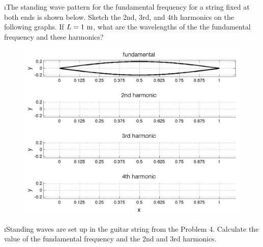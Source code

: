 \i The standing wave pattern for the fundamental
frequency for a string fixed at both ends is
shown below.
Sketch the 2nd, 3rd, and 4th harmonics on the
following graphs.
If $L=1~{\rm m}$, what are the wavelengths of the
the fundamental frequency and these harmonics?
%
\begin{figure}[!h]
  \begin{center}
  \includegraphics[width=5.5in]{standingwaves}
  \end{center}
\end{figure}
%
\FloatBarrier

\i Standing waves are set up in the guitar string
from the Problem 4.
Calculate the value of the fundamental frequency
and the 2nd and 3rd harmonics.

\een

